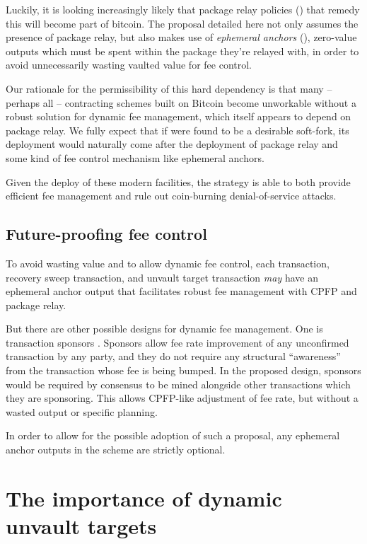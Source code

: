 \documentclass[10pt]{article}
\begin{document}
Luckily, it is looking increasingly likely that package relay policies
(\cite{OptechPkgRelay}) that remedy this will become part of bitcoin. The \opv{}
proposal detailed here not only assumes the presence of package relay, but also makes
use of \emph{ephemeral anchors} (\cite{Anchors}), zero-value outputs which must be 
spent within the package they're relayed with, in order to avoid unnecessarily wasting
vaulted value for fee control.

Our rationale for the permissibility of this hard dependency is that many -- perhaps
all -- contracting schemes built on Bitcoin become unworkable without a robust solution
for dynamic fee management, which itself appears to depend on package relay. We fully
expect that if \opv{} were found to be a desirable soft-fork, its deployment would
naturally come after the deployment of package relay and some kind of fee control
mechanism like ephemeral anchors.

Given the deploy of these modern facilities, the \opv{} strategy is able to both
provide efficient fee management and rule out coin-burning denial-of-service attacks.

\subsection*{Future-proofing fee control}

To avoid wasting value and to allow dynamic fee control, each \opuv{} transaction,
recovery sweep transaction, and unvault target transaction \emph{may} have an ephemeral
anchor output that facilitates robust fee management with CPFP and package relay.

But there are other possible designs for dynamic fee management. One is transaction
sponsors \cite{Sponsors}. Sponsors allow fee rate improvement of any unconfirmed
transaction by any party, and they do not require any structural ``awareness'' from the
transaction whose fee is being bumped. In the proposed design, sponsors would be
required by consensus to be mined alongside other transactions which they are
sponsoring. This allows CPFP-like adjustment of fee rate, but without a wasted output
or specific planning.

In order to allow for the possible adoption of such a proposal,
any ephemeral anchor outputs in the \opv{} scheme are strictly optional.

\section*{The importance of dynamic unvault targets}
\end{document}
